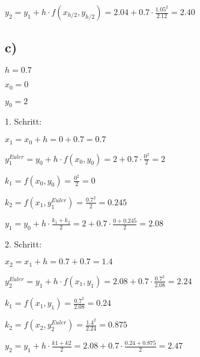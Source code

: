 \documentclass{article}
\begin{document}
\(y_2 = y_1 + h \cdot f(x_{h/2},y_{h/2}) = 2.04 + 0.7 \cdot \frac{1.05^2}{2.12} = 2.40\)

\newpage

\subsection*{c)}

\(h = 0.7\)

\(x_0 = 0\)

\(y_0 = 2\)

1. Schritt:

\(x_1 = x_0 + h = 0 + 0.7 = 0.7\)

\(y_1^{Euler} = y_0 + h \cdot f(x_0,y_0) = 2 + 0.7 \cdot \frac{0^2}{2} = 2\)

\(k_1 = f(x_0,y_0) = \frac{0^2}{2} = 0\)

\(k_2 = f(x_1,y_1^{Euler}) = \frac{0.7^2}{2} = 0.245\)

\(y_1 = y_0 + h \cdot \frac{k_1 + k_2}{2} = 2 + 0.7 \cdot \frac{0+0.245}{2} = 2.08\)

2. Schritt:

\(x_2 = x_1 + h = 0.7 + 0.7 = 1.4\)

\(y_2^{Euler} = y_1 + h \cdot f(x_1,y_1) = 2.08 + 0.7 \cdot \frac{0.7^2}{2.08} = 2.24\)

\(k_1 = f(x_1,y_1) = \frac{0.7^2}{2.08} = 0.24\)

\(k_2 = f(x_2,y_2^{Euler}) = \frac{1.4^2}{2.24} = 0.875\)

\(y_2 = y_1 + h \cdot \frac{k1+k2}{2} = 2.08 + 0.7 \cdot \frac{0.24+0.875}{2} = 2.47\)
\end{document}
